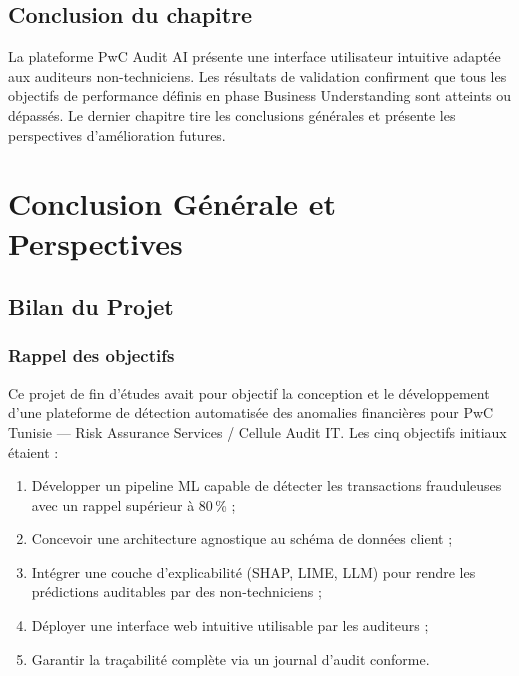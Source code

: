 \documentclass[12pt,a4paper,twoside]{report}
\theoremstyle{definition}
\begin{document}
\section{Conclusion du chapitre}

La plateforme PwC Audit AI présente une interface utilisateur intuitive
adaptée aux auditeurs non-techniciens. Les résultats de validation confirment
que tous les objectifs de performance définis en phase Business Understanding
sont atteints ou dépassés. Le dernier chapitre tire les conclusions générales
et présente les perspectives d'amélioration futures.

\chapter{Conclusion Générale et Perspectives}

\section{Bilan du Projet}

\subsection{Rappel des objectifs}

Ce projet de fin d'études avait pour objectif la conception et le développement
d'une plateforme de détection automatisée des anomalies financières pour
PwC Tunisie --- Risk Assurance Services / Cellule Audit IT. Les cinq
objectifs initiaux étaient :

\begin{enumerate}
  \item Développer un pipeline ML capable de détecter les transactions
    frauduleuses avec un rappel supérieur à 80\,\% ;
  \item Concevoir une architecture agnostique au schéma de données client ;
  \item Intégrer une couche d'explicabilité (SHAP, LIME, LLM) pour rendre
    les prédictions auditables par des non-techniciens ;
  \item Déployer une interface web intuitive utilisable par les auditeurs ;
  \item Garantir la traçabilité complète via un journal d'audit conforme.
\end{enumerate}
\end{document}
